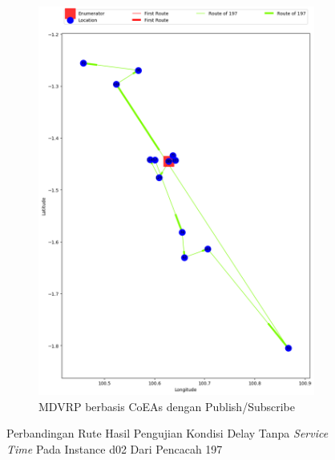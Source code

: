\begin{figure}[H]\ContinuedFloat
	\centering
	\begin{subfigure}[t]{\textwidth}
		\centering
		\includegraphics[width=\textwidth]{Resources/Images/delayed_2/real_m15_n100_delayed_2_197_pubsub_coes}
		\caption{MDVRP berbasis CoEAs dengan Publish/Subscribe}
		\label{fig:real_m15_n100_delayed_2_197_pubsub_coes}
	\end{subfigure}
	\caption{Perbandingan Rute Hasil Pengujian Kondisi Delay Tanpa \textit{Service Time} Pada Instance d02 Dari Pencacah 197}
	\label{fig:real_m15_n100_delayed_2_197_contd}
\end{figure}


